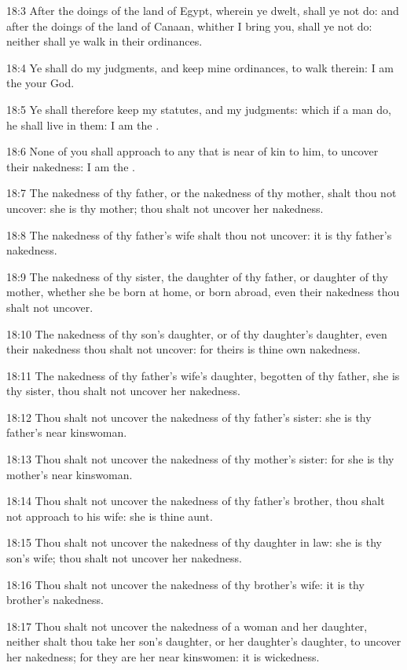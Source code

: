 18:3 After the doings of the land of Egypt, wherein ye dwelt, shall ye not do: and after the doings of the land of Canaan, whither I bring you, shall ye not do: neither shall ye walk in their ordinances.

18:4 Ye shall do my judgments, and keep mine ordinances, to walk therein: I am the \LORD your God.

18:5 Ye shall therefore keep my statutes, and my judgments: which if a man do, he shall live in them: I am the \LORD.

18:6 None of you shall approach to any that is near of kin to him, to uncover their nakedness: I am the \LORD.

18:7 The nakedness of thy father, or the nakedness of thy mother, shalt thou not uncover: she is thy mother; thou shalt not uncover her nakedness.

18:8 The nakedness of thy father's wife shalt thou not uncover: it is thy father's nakedness.

18:9 The nakedness of thy sister, the daughter of thy father, or daughter of thy mother, whether she be born at home, or born abroad, even their nakedness thou shalt not uncover.

18:10 The nakedness of thy son's daughter, or of thy daughter's daughter, even their nakedness thou shalt not uncover: for theirs is thine own nakedness.

18:11 The nakedness of thy father's wife's daughter, begotten of thy father, she is thy sister, thou shalt not uncover her nakedness.

18:12 Thou shalt not uncover the nakedness of thy father's sister: she is thy father's near kinswoman.

18:13 Thou shalt not uncover the nakedness of thy mother's sister: for she is thy mother's near kinswoman.

18:14 Thou shalt not uncover the nakedness of thy father's brother, thou shalt not approach to his wife: she is thine aunt.

18:15 Thou shalt not uncover the nakedness of thy daughter in law: she is thy son's wife; thou shalt not uncover her nakedness.

18:16 Thou shalt not uncover the nakedness of thy brother's wife: it is thy brother's nakedness.

18:17 Thou shalt not uncover the nakedness of a woman and her daughter, neither shalt thou take her son's daughter, or her daughter's daughter, to uncover her nakedness; for they are her near kinswomen: it is wickedness.

